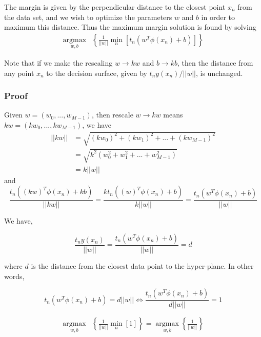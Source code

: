The margin is given by the perpendicular distance to the closest point $x_n$ from the data set, and we wish to optimize the parameters $w$ and $b$ in order to maximum this distance. Thus the maximum margin solution is found by solving
\begin{align}
    \label{formula:SVM_optimize}
    \operatorname*{argmax}_{w,b} & \left \{ \frac{1}{||w||} \operatorname*{min}_{n}\left[ t_n(w^T\phi (x_n) + b) \right] \right \}
\end{align}

Note that if we make the rescaling $w \rightarrow kw$ and $b \rightarrow kb$, then the distance from any point $x_n$ to the decision surface, given by $t_ny(x_n)/||w||$, is unchanged.

\subsubsection{Proof}

Given $w=(w_0, ..., w_{M-1})$, then rescale $w \rightarrow kw$ means  $kw = (kw_0, ..., kw_{M-1})$, we have
\begin{equation}
    \label{eq: rescaling vector}
    \begin{split}
     ||kw|| & = \sqrt{(kw_0)^2 + (kw_1)^2 + ... + (kw_{M-1})^2} \\
            & = \sqrt{k^2(w_0^2 + w_1^2 + ... + w_{M-1}^2)} \\
            & = k||w||
     \end{split}
\end{equation}
and
\begin{equation}
       \frac{t_n((kw)^T\phi(x_n) + kb)}{||kw||}
        = \frac{kt_n((w)^T\phi(x_n) + b)}{k||w||} = \frac{t_n(w^T\phi(x_n) + b)}{||w||}
\end{equation}

We have,

\begin{equation}
    \frac{t_ny(x_n)}{||w||} = \frac{t_n(w^T\phi(x_n) + b)}{||w||} = d
\end{equation}

where $d$ is the distance from the closest data point to the hyper-plane. In other words,

\begin{equation}
    t_n(w^T\phi(x_n) + b) = d||w|| \Leftrightarrow \frac{t_n(w^T\phi(x_n) + b)}{d||w||} = 1
\end{equation}


\begin{align}
    \label{formula:SVM_optimize}
    \operatorname*{argmax}_{w,b} & \left \{ \frac{1}{||w||} \operatorname*{min}_{n}\left[ 1 \right] \right \} = \operatorname*{argmax}_{w,b}  \left \{ \frac{1}{||w||} \right \}
\end{align}

